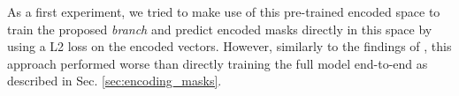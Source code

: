As a first experiment, we tried to make use of this pre-trained encoded space to train the proposed \emph{\encBr branch} and predict encoded masks directly in this space by using a L2 loss on the encoded vectors. However, similarly to the findings of \cite{hirsch2020patchperpix}, this approach performed worse than directly training the full model end-to-end as described in Sec. \ref{sec:encoding_masks}. \\



